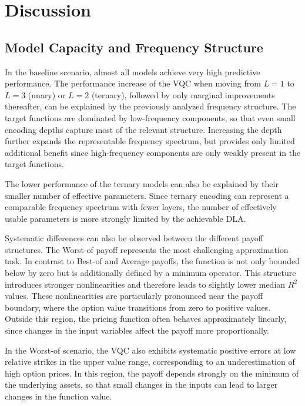 \chapter{Discussion}

\section{Model Capacity and Frequency Structure}

In the baseline scenario, almost all models achieve very high predictive
performance. The performance increase of the VQC when moving from
$L=1$ to $L=3$ (unary) or $L=2$ (ternary), followed by only marginal
improvements thereafter, can be explained by the previously analyzed
frequency structure. The target functions are dominated by
low-frequency components, so that even small encoding depths capture
most of the relevant structure. Increasing the depth further expands
the representable frequency spectrum, but provides only limited
additional benefit since high-frequency components are only weakly
present in the target functions.

The lower performance of the ternary models can also be explained by
their smaller number of effective parameters. Since ternary encoding
can represent a comparable frequency spectrum with fewer layers, the
number of effectively usable parameters is more strongly limited by
the achievable DLA.

Systematic differences can also be observed between the different
payoff structures. The Worst-of payoff represents the most challenging
approximation task. In contrast to Best-of and Average payoffs, the
function is not only bounded below by zero but is additionally defined
by a minimum operator. This structure introduces stronger nonlinearities
and therefore leads to slightly lower median $R^2$ values. These
nonlinearities are particularly pronounced near the payoff boundary,
where the option value transitions from zero to positive values.
Outside this region, the pricing function often behaves approximately
linearly, since changes in the input variables affect the payoff more
proportionally.

In the Worst-of scenario, the VQC also exhibits systematic positive
errors at low relative strikes in the upper value range, corresponding
to an underestimation of high option prices. In this region, the payoff
depends strongly on the minimum of the underlying assets, so that small
changes in the inputs can lead to larger changes in the function value.

